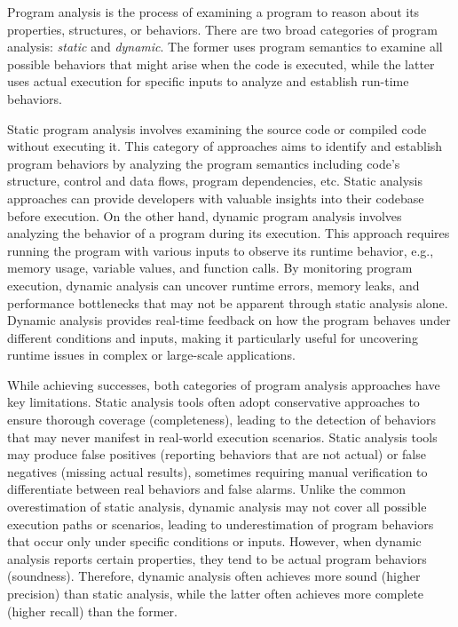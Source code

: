 
Program analysis is the process of examining a program to reason about
its properties, structures, or behaviors. There are two broad
categories of program analysis: {\em static} and {\em dynamic}. The
former uses program semantics to examine all possible behaviors that
might arise when the code is executed, while the latter uses actual
execution for specific inputs to analyze and establish run-time
behaviors.

Static program analysis involves examining the source code or compiled
code without executing it. This category of approaches aims to
identify and establish program behaviors by analyzing the program
semantics including code's structure, control and data flows, program
dependencies, etc. Static analysis approaches can provide developers
with valuable insights into their codebase before execution.
On the other hand, dynamic program analysis involves analyzing the
behavior of a program during its execution. This approach requires
running the program with various inputs to observe its runtime
behavior, e.g., memory usage, variable values, and function
calls. By monitoring program execution, dynamic analysis can uncover
runtime errors, memory leaks, and performance bottlenecks that may not
be apparent through static analysis alone. Dynamic analysis provides
real-time feedback on how the program behaves under different
conditions and inputs, making it particularly useful for uncovering
runtime issues in complex or large-scale applications.

While achieving successes, both categories of program analysis
approaches have key limitations. Static analysis tools often adopt
conservative approaches to ensure thorough coverage (completeness),
leading to the detection of behaviors that may never manifest in
real-world execution scenarios. Static analysis tools may produce
false positives (reporting behaviors that are not actual) or false
negatives (missing actual results), sometimes requiring manual
verification to differentiate between real behaviors and false
alarms. Unlike the common overestimation of static analysis, dynamic
analysis may not cover all possible execution paths or scenarios,
leading to underestimation of program behaviors that occur only under
specific conditions or inputs. However, when dynamic analysis reports
certain properties, they tend to be actual program behaviors
(soundness). Therefore, dynamic analysis often achieves more sound
(higher precision) than static analysis, while the latter often
achieves more complete (higher recall) than the former.

